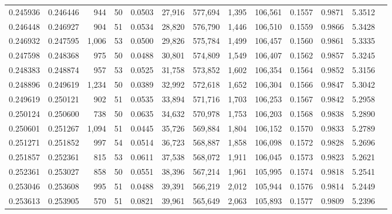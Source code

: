 \begin{tabular}{rrrrrrrrrrrrr}
0.245936 & 0.246446 &   944 &  50 &                                     0.0503 &  27,916 & 577,694 &   1,395 & 106,561 & 0.1557 & 0.9871 & 5.3512 \\
0.246448 & 0.246927 &   904 &  51 &                                     0.0534 &  28,820 & 576,790 &   1,446 & 106,510 & 0.1559 & 0.9866 & 5.3428 \\
0.246932 & 0.247595 & 1,006 &  53 &                                     0.0500 &  29,826 & 575,784 &   1,499 & 106,457 & 0.1560 & 0.9861 & 5.3335 \\
0.247598 & 0.248368 &   975 &  50 &                                     0.0488 &  30,801 & 574,809 &   1,549 & 106,407 & 0.1562 & 0.9857 & 5.3245 \\
0.248383 & 0.248874 &   957 &  53 &                                     0.0525 &  31,758 & 573,852 &   1,602 & 106,354 & 0.1564 & 0.9852 & 5.3156 \\
0.248896 & 0.249619 & 1,234 &  50 &                                     0.0389 &  32,992 & 572,618 &   1,652 & 106,304 & 0.1566 & 0.9847 & 5.3042 \\
0.249619 & 0.250121 &   902 &  51 &                                     0.0535 &  33,894 & 571,716 &   1,703 & 106,253 & 0.1567 & 0.9842 & 5.2958 \\
0.250124 & 0.250600 &   738 &  50 &                                     0.0635 &  34,632 & 570,978 &   1,753 & 106,203 & 0.1568 & 0.9838 & 5.2890 \\
0.250601 & 0.251267 & 1,094 &  51 &                                     0.0445 &  35,726 & 569,884 &   1,804 & 106,152 & 0.1570 & 0.9833 & 5.2789 \\
0.251271 & 0.251852 &   997 &  54 &                                     0.0514 &  36,723 & 568,887 &   1,858 & 106,098 & 0.1572 & 0.9828 & 5.2696 \\
0.251857 & 0.252361 &   815 &  53 &                                     0.0611 &  37,538 & 568,072 &   1,911 & 106,045 & 0.1573 & 0.9823 & 5.2621 \\
0.252361 & 0.253027 &   858 &  50 &                                     0.0551 &  38,396 & 567,214 &   1,961 & 105,995 & 0.1574 & 0.9818 & 5.2541 \\
0.253046 & 0.253608 &   995 &  51 &                                     0.0488 &  39,391 & 566,219 &   2,012 & 105,944 & 0.1576 & 0.9814 & 5.2449 \\
0.253613 & 0.253905 &   570 &  51 &                                     0.0821 &  39,961 & 565,649 &   2,063 & 105,893 & 0.1577 & 0.9809 & 5.2396 \\

\end{tabular}
